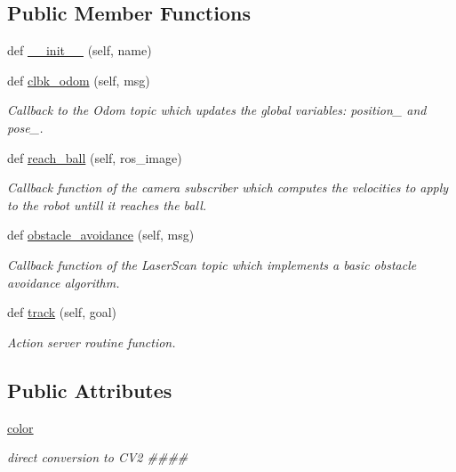 \subsection*{Public Member Functions}
\begin{DoxyCompactItemize}
\item 
def \hyperlink{classtrack_1_1TrackAction_ad71d2ce7ecd91c384219ada7e8ed74e3}{\+\_\+\+\_\+init\+\_\+\+\_\+} (self, name)
\item 
def \hyperlink{classtrack_1_1TrackAction_a1f92640237725d8789986694c90bd98a}{clbk\+\_\+odom} (self, msg)
\begin{DoxyCompactList}\small\item\em Callback to the Odom topic which updates the global variables\+: position\+\_\+ and pose\+\_\+. \end{DoxyCompactList}\item 
def \hyperlink{classtrack_1_1TrackAction_a3b41ed0eb7a403459469c27dd63a2392}{reach\+\_\+ball} (self, ros\+\_\+image)
\begin{DoxyCompactList}\small\item\em Callback function of the camera subscriber which computes the velocities to apply to the robot untill it reaches the ball. \end{DoxyCompactList}\item 
def \hyperlink{classtrack_1_1TrackAction_ab20439d63451e7799ecf2a2ec1f8c860}{obstacle\+\_\+avoidance} (self, msg)
\begin{DoxyCompactList}\small\item\em Callback function of the Laser\+Scan topic which implements a basic obstacle avoidance algorithm. \end{DoxyCompactList}\item 
def \hyperlink{classtrack_1_1TrackAction_a1d41a25e35227ab25323a95eeb9a4bb2}{track} (self, goal)
\begin{DoxyCompactList}\small\item\em Action server routine function. \end{DoxyCompactList}\end{DoxyCompactItemize}
\subsection*{Public Attributes}
\begin{DoxyCompactItemize}
\item 
\hyperlink{classtrack_1_1TrackAction_abba894c7d22403050003dc50f5d79bba}{color}
\begin{DoxyCompactList}\small\item\em direct conversion to C\+V2 \#\#\#\# \end{DoxyCompactList}\end{DoxyCompactItemize}
